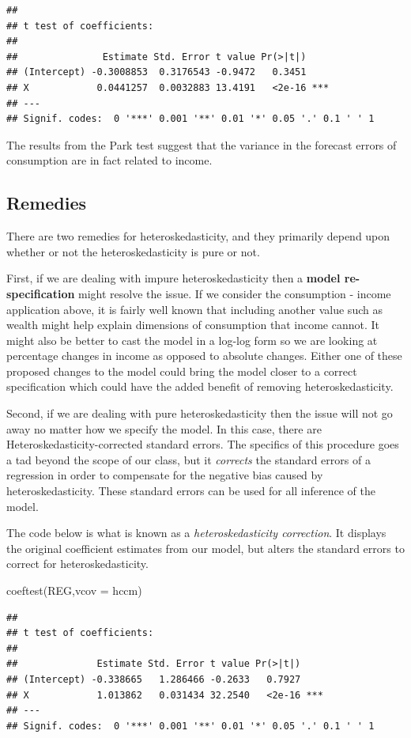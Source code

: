 \documentclass[
]{book}
\newenvironment{Shaded}{\begin{snugshade}}{\end{snugshade}}
\newcommand{\AttributeTok}[1]{\textcolor[rgb]{0.77,0.63,0.00}{#1}}
\newcommand{\FunctionTok}[1]{\textcolor[rgb]{0.00,0.00,0.00}{#1}}
\newcommand{\NormalTok}[1]{#1}
\begin{document}
\begin{verbatim}
## 
## t test of coefficients:
## 
##               Estimate Std. Error t value Pr(>|t|)    
## (Intercept) -0.3008853  0.3176543 -0.9472   0.3451    
## X            0.0441257  0.0032883 13.4191   <2e-16 ***
## ---
## Signif. codes:  0 '***' 0.001 '**' 0.01 '*' 0.05 '.' 0.1 ' ' 1
\end{verbatim}

The results from the Park test suggest that the variance in the forecast errors of consumption are in fact related to income.

\hypertarget{remedies}{%
\subsection{Remedies}\label{remedies}}

There are two remedies for heteroskedasticity, and they primarily depend upon whether or not the heteroskedasticity is pure or not.

First, if we are dealing with impure heteroskedasticity then a \textbf{model re-specification} might resolve the issue. If we consider the consumption - income application above, it is fairly well known that including another value such as wealth might help explain dimensions of consumption that income cannot. It might also be better to cast the model in a log-log form so we are looking at percentage changes in income as opposed to absolute changes. Either one of these proposed changes to the model could bring the model closer to a correct specification which could have the added benefit of removing heteroskedasticity.

Second, if we are dealing with pure heteroskedasticity then the issue will not go away no matter how we specify the model. In this case, there are Heteroskedasticity-corrected standard errors. The specifics of this procedure goes a tad beyond the scope of our class, but it \emph{corrects} the standard errors of a regression in order to compensate for the negative bias caused by heteroskedasticity. These standard errors can be used for all inference of the model.

The code below is what is known as a \emph{heteroskedasticity correction}. It displays the original coefficient estimates from our model, but alters the standard errors to correct for heteroskedasticity.

\begin{Shaded}
\begin{Highlighting}[]
\FunctionTok{coeftest}\NormalTok{(REG,}\AttributeTok{vcov =}\NormalTok{ hccm)}
\end{Highlighting}
\end{Shaded}

\begin{verbatim}
## 
## t test of coefficients:
## 
##              Estimate Std. Error t value Pr(>|t|)    
## (Intercept) -0.338665   1.286466 -0.2633   0.7927    
## X            1.013862   0.031434 32.2540   <2e-16 ***
## ---
## Signif. codes:  0 '***' 0.001 '**' 0.01 '*' 0.05 '.' 0.1 ' ' 1
\end{verbatim}
\end{document}
